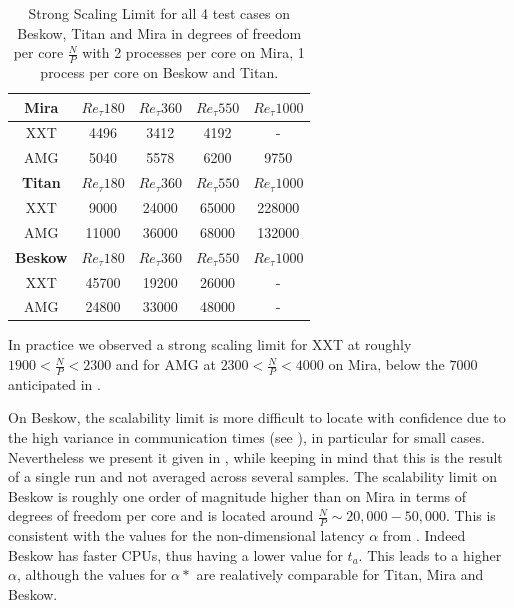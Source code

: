 \documentclass{sig-alternate}
\begin{document}
\begin{table}  
  \caption{Strong Scaling Limit for all 4 test cases on Beskow, Titan and Mira
  in degrees of freedom per core $\frac{N}{P}$ with 2 processes per core on Mira, 1 process per core on Beskow and Titan.}%
  \centering
  \begin{tabular}{c||cccc}
    \hline
    \hline
    {\bf Mira}
    &$Re_{\tau} 180$&$Re_{\tau} 360$&$Re_{\tau} 550$&$Re_{\tau} 1000$\\
    \hline
    XXT&4496&3412&4192&-\\
    AMG&5040&5578&6200&9750\\
    \hline
    \hline
    {\bf Titan}
    &$Re_{\tau} 180$&$Re_{\tau} 360$&$Re_{\tau} 550$&$Re_{\tau} 1000$\\
    \hline
    XXT&9000&24000&65000&228000\\
    AMG&11000&36000&68000&132000\\
    \hline
    \hline
    {\bf Beskow}
    &$Re_{\tau} 180$&$Re_{\tau} 360$&$Re_{\tau} 550$&$Re_{\tau} 1000$\\
    \hline
    XXT&45700&19200&26000& - \\
    AMG&24800&33000&48000& - \\
    \hline
    \hline
  \end{tabular}
  \label{tab:stronglimit}
\end{table}

% 

In practice we observed a strong scaling limit for XXT at roughly $1900<
\frac{N}{P} < 2300$ and for AMG at $2300<\frac{N}{P}<4000$ on Mira, below the $7000$
anticipated in \cite{fischer:scaling}. 

On Beskow, the scalability limit is more difficult to locate with confidence due 
to the high variance in communication times (see ), 
in particular for small cases. Nevertheless we present it given in 
, while keeping in mind that this is the result of a 
single run and not averaged across several samples. The scalability limit on 
Beskow is roughly one order of magnitude higher than on Mira in terms of degrees
of freedom per core and is located around $\frac{N}{P} \sim 20,000 - 50,000$. This 
is consistent with the values for the non-dimensional latency $\alpha$ 
from . Indeed Beskow has faster CPUs, thus having a
lower value for $t_a$. This leads to a higher $\alpha$, although the values for
$\alpha*$ are realatively comparable for Titan, Mira and Beskow. %
\end{document}
